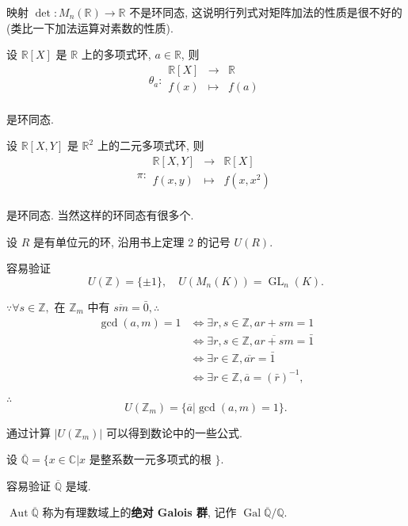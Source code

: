 \documentclass{ctexart}
\begin{document}
\begin{example}
    映射 $\det:M_n(\mathbb{R})\to\mathbb{R}$ 不是环同态, 这说明行列式对矩阵加法的性质是很不好的(类比一下加法运算对素数的性质).
\end{example}
\begin{example}
    设 $\mathbb{R}[X]$ 是 $\mathbb{R}$ 上的多项式环, $a\in\mathbb{R}$, 则
    \[\theta_a:\begin{array}{rcl}
        \mathbb{R}[X] & \to & \mathbb{R} \\
        f(x) & \mapsto & f(a) \\
    \end{array}\]

    是环同态.

    设 $\mathbb{R}[X,Y]$ 是 $\mathbb{R}^2$ 上的二元多项式环, 则
    \[\pi:\begin{array}{rcl}
        \mathbb{R}[X,Y] & \to & \mathbb{R}[X] \\
        f(x,y) & \mapsto & f(x,x^2) \\
    \end{array}\]

    是环同态. 当然这样的环同态有很多个.
\end{example}
\begin{example}
    设 $R$ 是有单位元的环, 沿用书上定理 2 的记号 $U(R)$.

    容易验证
    \[U(\mathbb{Z})=\{\pm1\},\quad U(M_n(K))=\operatorname{GL}_n(K).\]

    $\because\forall s\in\mathbb{Z},$ 在 $\mathbb{Z}_m$ 中有 $\overline{sm}=\bar{0},\therefore$
    \begin{align*}
        \gcd(a,m)=1 & \Leftrightarrow\exists r,s\in\mathbb{Z},ar+sm=1 \\
        & \Leftrightarrow\exists r,s\in\mathbb{Z},\overline{ar+sm}=\bar{1} \\
        & \Leftrightarrow\exists r\in\mathbb{Z},\overline{ar}=\bar{1} \\
        & \Leftrightarrow\exists r\in\mathbb{Z},\overline{a}=(\bar{r})^{-1},
    \end{align*}

    $\therefore$
    \[U(\mathbb{Z}_m)=\{\overline{a}|\gcd(a,m)=1\}.\]

    通过计算 $|U(\mathbb{Z}_m)|$ 可以得到数论中的一些公式.
\end{example}
\begin{example}
    设 $\overline{\mathbb{Q}}=\{x\in\mathbb{C}|x$ 是整系数一元多项式的根 $\}$.

    容易验证 $\overline{\mathbb{Q}}$ 是域.

    $\operatorname{Aut}\overline{\mathbb{Q}}$ 称为有理数域上的\textbf{绝对 Galois 群}, 记作 $\operatorname{Gal}\overline{\mathbb{Q}}/\mathbb{Q}$.
\end{example}
\end{document}
